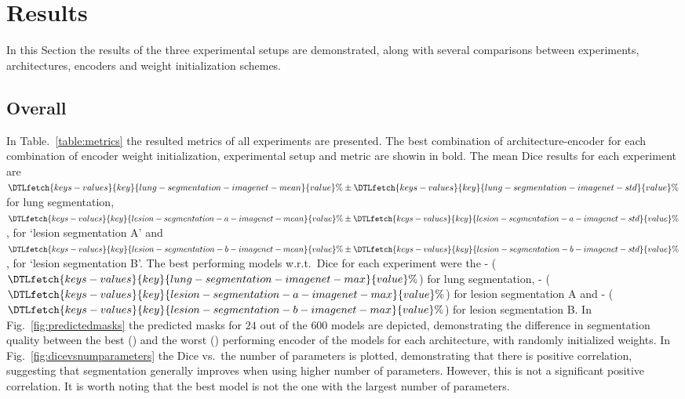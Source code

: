 \documentclass{elsarticle}
\begin{document}
\section{Results}\label{sec:results}
In this Section the results of the three experimental setups are demonstrated, along with several comparisons between experiments, architectures, encoders and weight initialization schemes.

\subsection{Overall}
In Table.~\ref{table:metrics} the resulted metrics of all experiments are presented.
The best combination of architecture-encoder for each combination of encoder weight initialization, experimental setup and metric are showin in bold.
The mean Dice results for each experiment are $\DTLfetch{keys-values}{key}{lung-segmentation-imagenet-mean}{value}\%\pm\DTLfetch{keys-values}{key}{lung-segmentation-imagenet-std}{value}\%$ for lung segmentation, $\DTLfetch{keys-values}{key}{lesion-segmentation-a-imagenet-mean}{value}\%\pm\DTLfetch{keys-values}{key}{lesion-segmentation-a-imagenet-std}{value}\%$, for `lesion segmentation A' and $\DTLfetch{keys-values}{key}{lesion-segmentation-b-imagenet-mean}{value}\%\pm\DTLfetch{keys-values}{key}{lesion-segmentation-b-imagenet-std}{value}\%$, for `lesion segmentation B'.
The best performing models w.r.t.\ Dice for each experiment were the - ($\DTLfetch{keys-values}{key}{lung-segmentation-imagenet-max}{value}\%$) for lung segmentation, - ($\DTLfetch{keys-values}{key}{lesion-segmentation-a-imagenet-max}{value}\%$) for lesion segmentation A and - ($\DTLfetch{keys-values}{key}{lesion-segmentation-b-imagenet-max}{value}\%$) for lesion segmentation B.
In Fig.~\ref{fig:predictedmasks} the predicted masks for $24$ out of the $600$ models are depicted, demonstrating the difference in segmentation quality between the best () and the worst () performing encoder of the models for each architecture, with randomly initialized weights.
In Fig.~\ref{fig:dicevsnumparameters} the Dice vs.\ the number of parameters is plotted, demonstrating that there is positive correlation, suggesting that segmentation generally improves when using higher number of parameters.
However, this is not a significant positive correlation.
It is worth noting that the best model is not the one with the largest number of parameters.
\end{document}
